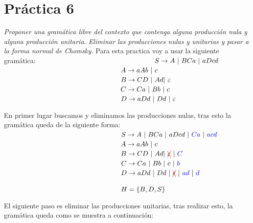 \section{Práctica 6}
\textit{Proponer una gramática libre del contexto que contenga alguna producción nula y alguna producción unitaria. Eliminar las producciones nulas y unitarias y pasar a la forma normal de Chomsky.}
\newline
Para esta practica voy a usar la siguiente gramática:\vspace{0.5em} \newline
$ \hspace*{6cm}S\rightarrow A\  |\  BCa\  |\ aDcd $\newline
$ \hspace*{6cm}A\rightarrow aAb\ |\ c $\newline
$ \hspace*{6cm}B\rightarrow CD\  |\  Ad |\   \varepsilon $\newline
$ \hspace*{6cm}C\rightarrow Ca\  |\  Bb \ |\ c $\newline
$ \hspace*{6cm}D\rightarrow aDd\ |\ Dd\ |\ \varepsilon $\newline

En primer lugar buscamos y eliminamos las producciones nulas, tras esto la gramática queda de la siguiente forma:\vspace{0.5em} \newline
$ \hspace*{6cm}S\rightarrow A\  |\  BCa\  |\ aDcd \  |\Blue{\ Ca\ }  |\ \Blue{acd} $\newline
$ \hspace*{6cm}A\rightarrow aAb\ |\ c $\newline
$ \hspace*{6cm}B\rightarrow CD\  |\  Ad |\  \Rcancel{ \varepsilon} \  |\ \Blue{C}$\newline
$ \hspace*{6cm}C\rightarrow Ca\  |\  Bb \ |\ c \  |\ \Blue{b} $\newline
$ \hspace*{6cm}D\rightarrow aDd\ |\ Dd\ |\ \Rcancel{ \varepsilon} \  |\ \Blue{ad}\  |\ \Blue{d} $\newline

$\hspace*{6cm}H = \{B,D,S\}$\vspace{0.5em} 

El siguiente paso es eliminar las producciones unitarias, tras realizar esto, la gramática queda como se muestra a continuación:\vspace{0.5em} \newline

